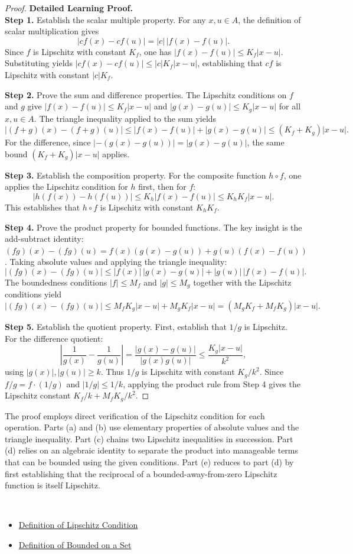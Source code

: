 \begin{proof}
\textbf{Detailed Learning Proof.}~\\

\textbf{Step 1.} Establish the scalar multiple property.
For any $x, u \in A$, the definition of scalar multiplication gives
\[|cf(x) - cf(u)| = |c|\,|f(x) - f(u)|.\]
Since $f$ is Lipschitz with constant $K_f$, one has $|f(x) - f(u)| \leq K_f |x - u|$. Substituting yields $|cf(x) - cf(u)| \leq |c| K_f |x - u|$, establishing that $cf$ is Lipschitz with constant $|c|K_f$.

\textbf{Step 2.} Prove the sum and difference properties.
The Lipschitz conditions on $f$ and $g$ give $|f(x) - f(u)| \leq K_f|x - u|$ and $|g(x) - g(u)| \leq K_g|x - u|$ for all $x, u \in A$. The triangle inequality applied to the sum yields
\[|(f + g)(x) - (f + g)(u)| \leq |f(x) - f(u)| + |g(x) - g(u)| \leq (K_f + K_g)|x - u|.\]
For the difference, since $|{-}(g(x) - g(u))| = |g(x) - g(u)|$, the same bound $(K_f + K_g)|x - u|$ applies.

\textbf{Step 3.} Establish the composition property.
For the composite function $h \circ f$, one applies the Lipschitz condition for $h$ first, then for $f$:
\[|h(f(x)) - h(f(u))| \leq K_h |f(x) - f(u)| \leq K_h K_f |x - u|.\]
This establishes that $h \circ f$ is Lipschitz with constant $K_h K_f$.

\textbf{Step 4.} Prove the product property for bounded functions.
The key insight is the add-subtract identity: $(fg)(x) - (fg)(u) = f(x)(g(x) - g(u)) + g(u)(f(x) - f(u))$. Taking absolute values and applying the triangle inequality:
\[|(fg)(x) - (fg)(u)| \leq |f(x)|\,|g(x) - g(u)| + |g(u)|\,|f(x) - f(u)|.\]
The boundedness conditions $|f| \leq M_f$ and $|g| \leq M_g$ together with the Lipschitz conditions yield
\[|(fg)(x) - (fg)(u)| \leq M_f K_g |x - u| + M_g K_f |x - u| = (M_g K_f + M_f K_g)|x - u|.\]

\textbf{Step 5.} Establish the quotient property.
First, establish that $1/g$ is Lipschitz. For the difference quotient:
\[\left|\frac{1}{g(x)} - \frac{1}{g(u)}\right| = \frac{|g(x) - g(u)|}{|g(x)g(u)|} \leq \frac{K_g |x - u|}{k^2},\]
using $|g(x)|, |g(u)| \geq k$. Thus $1/g$ is Lipschitz with constant $K_g/k^2$. Since $f/g = f \cdot (1/g)$ and $|1/g| \leq 1/k$, applying the product rule from Step 4 gives the Lipschitz constant $K_f/k + M_f K_g/k^2$.
\end{proof}

\begin{remark*}
The proof employs direct verification of the Lipschitz condition for each operation. Parts (a) and (b) use elementary properties of absolute values and the triangle inequality. Part (c) chains two Lipschitz inequalities in succession. Part (d) relies on an algebraic identity to separate the product into manageable terms that can be bounded using the given conditions. Part (e) reduces to part (d) by first establishing that the reciprocal of a bounded-away-from-zero Lipschitz function is itself Lipschitz.
\end{remark*}

\begin{remark*}[Dependencies]~\\
\begin{itemize}
  \item \hyperref[def:lipschitz-condition]{Definition of Lipschitz Condition}
  \item \hyperref[def:bounded-on-a-set]{Definition of Bounded on a Set}
\end{itemize}
\end{remark*}

